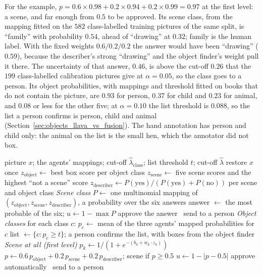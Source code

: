 For the example, $p = 0.6 \times 0.98 + 0.2 \times 0.94 + 0.2 \times 0.99 = 0.97$ at the first level: a scene, and far enough from $0.5$ to be approved. Its scene class, from the mapping fitted on the $582$ class-labelled training pictures of the same split, is ``family'' with probability $0.54$, ahead of ``drawing'' at $0.32$; family is the human label. With the fixed weights $0.6/0.2/0.2$ the answer would have been ``drawing'' ($0.59$), because the describer's strong ``drawing'' and the object finder's weight pull it there. The uncertainty of that answer, $0.46$, is above the cut-off $0.26$ that the $199$ class-labelled calibration pictures give at $\alpha = 0.05$, so the class goes to a person. Its object probabilities, with mappings and threshold fitted on books that do not contain the picture, are $0.93$ for person, $0.37$ for child and $0.23$ for animal, and $0.08$ or less for the other five; at $\alpha = 0.10$ the list threshold is $0.088$, so the list a person confirms is person, child and animal (Section~\ref{sec:objects_llava_vs_fusion}). The hand annotation has person and child only: the animal on the list is the small hen, which the annotator did not box.

\begin{algorithm}[!htbp]
\caption{Deciding one picture}
\label{alg:decide}
\begin{algorithmic}[1]
\Require picture $x$; the agents' mappings; cut-off $\hat\lambda_{\text{class}}$; list threshold $t$; cut-off $\hat\lambda$
\State restore $x$ once
\State $z_{\text{object}} \gets$ best box score per object class 
\State $z_{\text{scene}} \gets$ five scene scores and the highest ``not a scene'' score 
\State $z_{\text{describer}} \gets P(\text{yes})/(P(\text{yes})+P(\text{no}))$ per scene and object class 
\Statex \textit{Scene class}
\State $P \gets$ one multinomial mapping of $(z_{\text{object}}, z_{\text{scene}}, z_{\text{describer}})$, a probability over the six answers
\State answer $\gets$ the most probable of the six; $u \gets 1 - \max P$
 approve the answer \Else\ send to a person \EndIf
\Statex \textit{Object classes}
\State for each class $c$: $p_c \gets$ mean of the three agents' mapped probabilities for $c$
\State list $\gets \{c : p_c \ge t\}$; a person confirms the list, with boxes from the object finder
\Statex \textit{Scene at all (first level)}
 \State $p_k \gets 1/(1 + e^{-(b_k + w_k \cdot z_k)})$  \EndFor
\State $p \gets 0.6\,p_{\text{object}} + 0.2\,p_{\text{scene}} + 0.2\,p_{\text{describer}}$; scene if $p \ge 0.5$
\State $u \gets 1 - |p - 0.5|$
 approve automatically \Else\ send to a person \EndIf
\end{algorithmic}
\end{algorithm}

